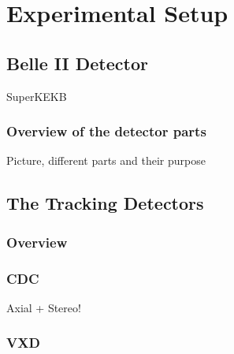 \chapter{Experimental Setup}
\section{Belle II Detector}
SuperKEKB
\subsection{Overview of the detector parts}
Picture, different parts and their purpose
\section{The Tracking Detectors}
\subsection{Overview}
\subsection{CDC}
Axial + Stereo!
\subsection{VXD}